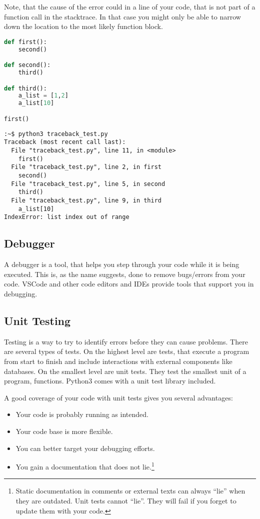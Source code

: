 \documentclass{article}
\newcommand{\qq}[1]{``#1''}
\begin{document}
Note, that the cause of the error could in a line of your code, that is not part of
a function call in the stacktrace.
In that case you might only be able to narrow down the location to the most
likely function block.


\begin{lstlisting}[language=python]
def first():
    second()

def second():
    third()

def third():
    a_list = [1,2]
    a_list[10]

first()
\end{lstlisting}

\begin{lstlisting}
:~$ python3 traceback_test.py 
Traceback (most recent call last):
  File "traceback_test.py", line 11, in <module>
    first()
  File "traceback_test.py", line 2, in first
    second()
  File "traceback_test.py", line 5, in second
    third()
  File "traceback_test.py", line 9, in third
    a_list[10]
IndexError: list index out of range
\end{lstlisting}

\subsection{Debugger}

A debugger is a tool, that helps you step through your code while it is being executed.
This is, as the name suggests, done to remove bugs/errors from your code.
VSCode and other code editors and IDEs provide tools that support you in debugging.

\subsection{Unit Testing}

Testing is a way to try to identify errors before they can cause problems.
There are several types of tests.
On the highest level are tests, that execute a program from start to finish
and include interactions with external components like databases.
On the smallest level are unit tests.
They test the smallest unit of a program, functions.
Python3 comes with a unit test library included.

A good coverage of your code with unit tests gives you several advantages:

\begin{itemize}
    \item Your code is probably running as intended.
    \item Your code base is more flexible.
    \item You can better target your debugging efforts.
    \item You gain a documentation that does not lie.\footnote{
              Static documentation in comments or external texts can always
              \qq{lie} when they are outdated.
              Unit tests cannot \qq{lie}.
              They will fail if you forget to update them with your code.}
\end{itemize}
\end{document}
